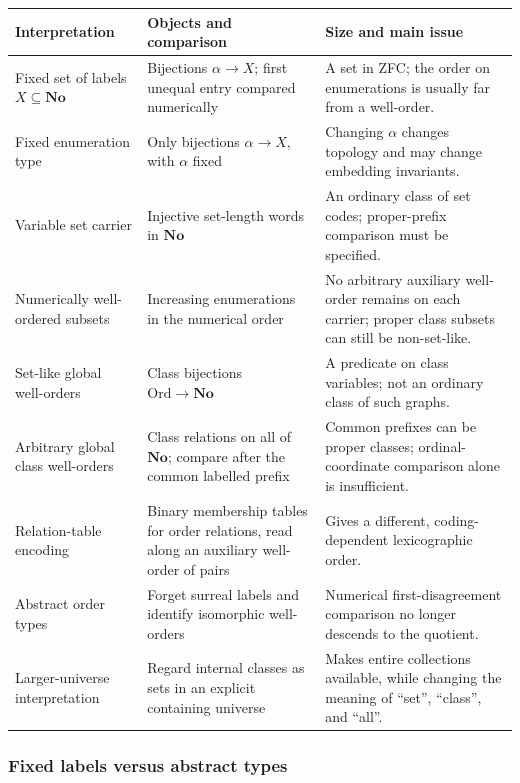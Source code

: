 \documentclass[11pt]{article}
\theoremstyle{definition}
\theoremstyle{remark}
\newcommand{\No}{\mathbf{No}}
\newcommand{\Ord}{\mathrm{Ord}}
\begin{document}
\begin{longtable}{@{}>{\raggedright\arraybackslash}p{}>{\raggedright\arraybackslash}p{}>{\raggedright\arraybackslash}p{}@{}}
\toprule
Interpretation & Objects and comparison & Size and main issue\\
\midrule\endhead
Fixed set of labels $X\subseteq\No$ & Bijections $\alpha\to X$; first unequal
entry compared numerically & A set in ZFC; the order on enumerations is
usually far from a well-order.\\[5pt]
Fixed enumeration type & Only bijections $\alpha\to X$, with $\alpha$ fixed &
Changing $\alpha$ changes topology and may change embedding invariants.\\[5pt]
Variable set carrier & Injective set-length words in $\No$ & An ordinary
class of set codes; proper-prefix comparison must be specified.\\[5pt]
Numerically well-ordered subsets & Increasing enumerations in the numerical
order & No arbitrary auxiliary well-order remains on each carrier; proper
class subsets can still be non-set-like.\\[5pt]
Set-like global well-orders & Class bijections $\Ord\to\No$ & A predicate on
class variables; not an ordinary class of such graphs.\\[5pt]
Arbitrary global class well-orders & Class relations on all of $\No$;
compare after the common labelled prefix & Common prefixes can be proper
classes; ordinal-coordinate comparison alone is insufficient.\\[5pt]
Relation-table encoding & Binary membership tables for order relations,
read along an auxiliary well-order of pairs & Gives a different,
coding-dependent lexicographic order.\\[5pt]
Abstract order types & Forget surreal labels and identify isomorphic
well-orders & Numerical first-disagreement comparison no longer descends to
the quotient.\\[5pt]
Larger-universe interpretation & Regard internal classes as sets in an
explicit containing universe & Makes entire collections available, while
changing the meaning of ``set'', ``class'', and ``all''.\\
\bottomrule
\end{longtable}

\subsubsection{Fixed labels versus abstract types}
\end{document}
